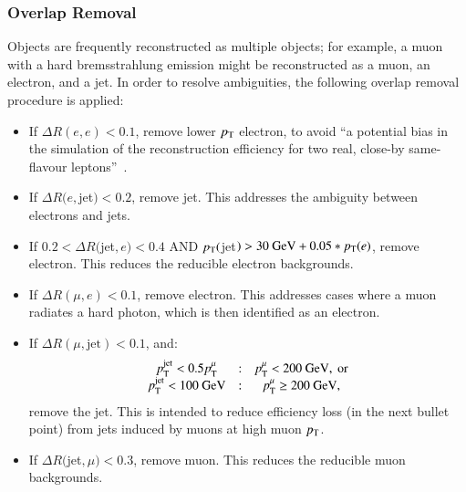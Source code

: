 \subsubsection{Overlap Removal}\label{sec:model-independent-overlap-removal}
Objects are frequently reconstructed as multiple objects; for example, a muon with a hard bremsstrahlung emission might be reconstructed as a muon, an electron, and a jet. In order to resolve ambiguities, the following overlap removal procedure is applied:

\begin{itemize}
	\item If $\Delta R(e, e) < 0.1$, remove lower $p_{\text{T}}$ electron, to avoid ``a potential bias in the simulation of the reconstruction efficiency for two real, close-by same-flavour leptons''~\cite{Adams:2014wx}.
	\item If $\Delta R(e, $jet$) < 0.2$, remove jet. This addresses the ambiguity between electrons and jets.
	\item If $0.2 < \Delta R($jet$, e) < 0.4$ AND $p_{\text{T}}($jet$) > 30~\mbox{GeV} + 0.05 * p_{\text{T}}(e)$, remove electron. This reduces the reducible electron backgrounds.
	\item If $\Delta R(\mu, e) < 0.1$, remove electron. This addresses cases where a muon radiates a hard photon, which is then identified as an electron.
	\item If $\Delta R(\mu, \mbox{jet})<0.1$, and:
	\begin{equation}
		\begin{array}{ccc}
			p_{\text{T}}^{\mathrm{jet}}<0.5 p_{\text{T}}^{\mu} & : & p_{\text{T}}^{\mu} < 200~\mbox{GeV},\ \mbox{or} \\
			p_{\text{T}}^{\mathrm{jet}}<100~\mbox{GeV} & : & p_{\text{T}}^{\mu} \geq 200~\mbox{GeV},
		\end{array}
	\end{equation}
	remove the jet. This is intended to reduce efficiency loss (in the next bullet point) from jets induced by muons at high muon $p_{\text{T}}$. 
	\item If $\Delta R($jet$, \mu) < 0.3$, remove muon. This reduces the reducible muon backgrounds.
\end{itemize}

